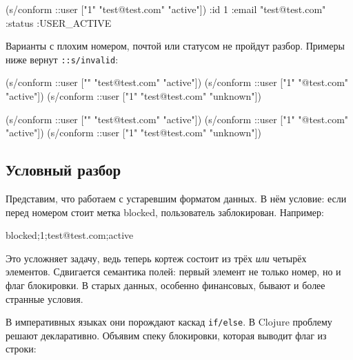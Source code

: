 \else

\begin{english}
  \begin{clojure}
(s/conform ::user ["1" "test@test.com" "active"])
{:id 1
 :email "test@test.com"
 :status :USER_ACTIVE}
  \end{clojure}
\end{english}

\fi

Варианты с плохим номером, почтой или статусом не пройдут разбор. Примеры ниже
вернут \verb|::s/invalid|:

\ifx\devicetype\mobile

\begin{english}
  \begin{clojure}
(s/conform ::user
  ["" "test@test.com" "active"])
(s/conform ::user
  ["1" "@test.com" "active"])
(s/conform ::user
  ["1" "test@test.com" "unknown"])
  \end{clojure}
\end{english}

\else

\begin{english}
  \begin{clojure}
(s/conform ::user ["" "test@test.com" "active"])
(s/conform ::user ["1" "@test.com" "active"])
(s/conform ::user ["1" "test@test.com" "unknown"])
  \end{clojure}
\end{english}

\fi

\subsection{Условный разбор}

Представим, что работаем с устаревшим форматом данных. В нём условие: если
перед номером стоит метка blocked, пользователь заблокирован. Например:

\begin{english}
  \begin{text}
blocked;1;test@test.com;active
  \end{text}
\end{english}

Это усложняет задачу, ведь теперь кортеж состоит из трёх \emph{или} четырёх
элементов. Сдвигается семантика полей: первый элемент не только номер, но и флаг
блокировки. В старых данных, особенно финансовых, бывают и более странные
условия.

В императивных языках они порождают каскад \verb|if/else|. В Clojure проблему
решают декларативно. Объявим спеку блокировки, которая выводит флаг из строки:


